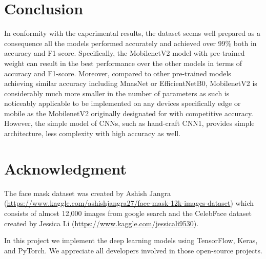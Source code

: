 \documentclass[conference]{IEEEtran}
\begin{document}
\section{Conclusion}
In conformity with the experimental results, the dataset seems well prepared  as a consequence all the models performed accurately and achieved over 99\% both in accuracy and F1-score. Specifically, the MobilenetV2 model with pre-trained weight can result in the best performance over the other models in terms of accuracy and F1-score. Moreover, compared to other pre-trained models achieving similar accuracy including MnasNet or EfficientNetB0, MobilenetV2 is considerably much more smaller in the number of parameters as such is noticeably applicable to be implemented on any devices specifically edge or mobile as the MobilenetV2 originally designated for with competitive accuracy. However, the simple model of CNNs, such as hand-craft CNN1, provides simple architecture, less complexity with high accuracy as well.

\section*{Acknowledgment}

The face mask dataset was created by Ashish Jangra (\url{https://www.kaggle.com/ashishjangra27/face-mask-12k-images-dataset}) which consists of almost 12,000 images from google search and the CelebFace dataset created by Jessica Li (\url{https://www.kaggle.com/jessicali9530}). 

In this project we implement the deep learning models using TensorFlow, Keras, and PyTorch. We appreciate all developers involved in those open-source projects. 



\printbibliography
\end{document}
